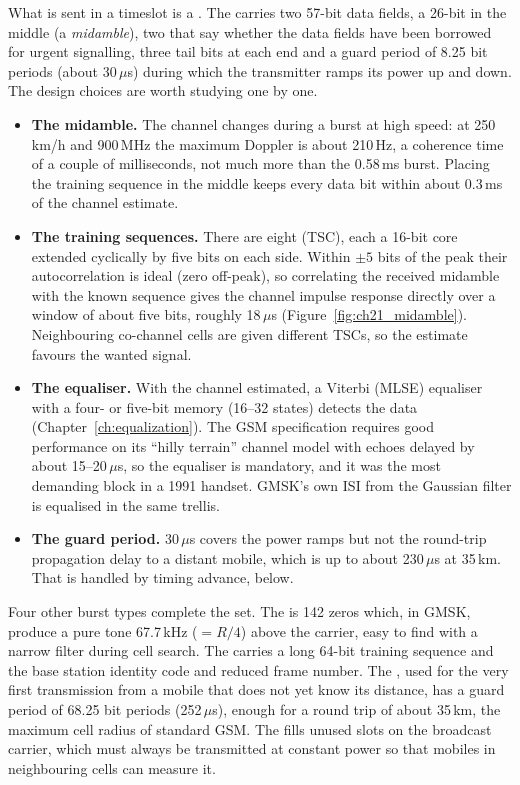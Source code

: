 What is sent in a timeslot is a . The  carries two 57-bit data
fields, a 26-bit  in the middle (a \emph{midamble}), two
 that say whether the data fields have been borrowed for urgent signalling,
three tail bits at each end and a guard period of 8.25 bit periods (about 30\,$\mu$s) during which
the transmitter ramps its power up and down. The design choices are worth studying one by one.
\begin{itemize}
\item \textbf{The midamble.} The channel changes during a burst at high speed: at 250\,km/h and
900\,MHz the maximum Doppler is about 210\,Hz, a coherence time of a couple of milliseconds, not
much more than the 0.58\,ms burst. Placing the training sequence in the middle keeps every data bit
within about 0.3\,ms of the channel estimate.
\item \textbf{The training sequences.} There are eight  (TSC), each a
16-bit core extended cyclically by five bits on each side. Within $\pm5$ bits of the peak their
autocorrelation is ideal (zero off-peak), so correlating the received midamble with the known
sequence gives the channel impulse response directly over a window of about five bits, roughly
18\,$\mu$s (Figure~\ref{fig:ch21_midamble}). Neighbouring co-channel cells are given different
TSCs, so the estimate favours the wanted signal.
\item \textbf{The equaliser.} With the channel estimated, a Viterbi (MLSE) equaliser with a four-
or five-bit memory (16--32 states) detects the data (Chapter~\ref{ch:equalization}). The GSM
specification requires good performance on its ``hilly terrain'' channel model with echoes delayed
by about 15--20\,$\mu$s, so the equaliser is mandatory, and it was the most demanding block in a
1991 handset. GMSK's own ISI from the Gaussian filter is equalised in the same trellis.
\item \textbf{The guard period.} 30\,$\mu$s covers the power ramps but not the round-trip
propagation delay to a distant mobile, which is up to about 230\,$\mu$s at 35\,km. That is handled
by timing advance, below.
\end{itemize}

Four other burst types complete the set. The  is 142 zeros which,
in GMSK, produce a pure tone 67.7\,kHz ($=R/4$) above the carrier, easy to find with a narrow filter
during cell search. The  carries a long 64-bit training sequence and the
base station identity code and reduced frame number. The , used for the very
first transmission from a mobile that does not yet know its distance, has a guard period of 68.25
bit periods (252\,$\mu$s), enough for a round trip of about 35\,km, the maximum cell radius of
standard GSM. The  fills unused slots on the broadcast carrier, which must always
be transmitted at constant power so that mobiles in neighbouring cells can measure it.

